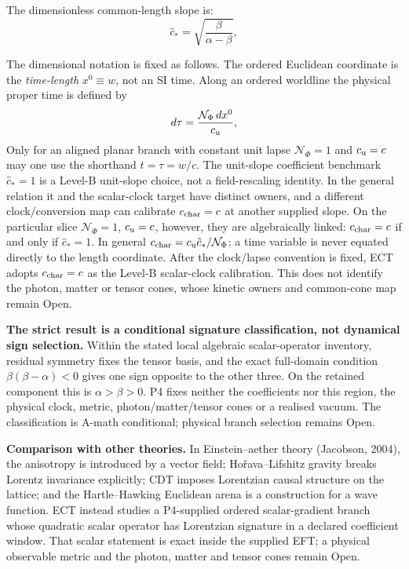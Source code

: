 \documentclass[11pt,a4paper]{article}
\begin{document}
The dimensionless common-length slope is:
\begin{equation}
  \hat c_* = \sqrt{\frac{\beta}{\alpha - \beta}},
  \label{eq:pop_cstar}
\end{equation}

The dimensional notation is fixed as follows.  The ordered Euclidean
coordinate is the \emph{time-length} $x^0\equiv w$, not an SI time.
Along an ordered worldline the physical proper time is defined by
\begin{equation}
  d\tau=\frac{\mathcal N_\Phi\,dx^0}{c_{\rm u}},
  \label{eq:pop_proper_time}
\end{equation}
Only for an aligned planar branch with constant unit lapse
$\mathcal N_\Phi=1$ and $c_{\rm u}=c$ may one use the shorthand
$t=\tau=w/c$.  The unit-slope coefficient benchmark $\hat c_*=1$ is a
Level-B unit-slope choice, not a field-rescaling identity.  In the general
relation it and the scalar-clock target have distinct owners, and a different
clock/conversion map can calibrate $c_{\rm char}=c$ at another supplied slope.
On the particular slice $\mathcal N_\Phi=1$, $c_{\rm u}=c$, however, they are
algebraically linked: $c_{\rm char}=c$ if and only if $\hat c_*=1$.  In general
$c_{\rm char}=c_{\rm u}\hat c_*/\mathcal N_\Phi$; a time variable is never
equated directly to the length coordinate.  After the clock/lapse convention
is fixed, ECT adopts $c_{\rm char}=c$ as the Level-B scalar-clock
calibration.  This does not identify the photon, matter or tensor cones, whose
kinetic owners and common-cone map remain Open.

\textbf{The strict result is a conditional signature classification, not dynamical sign selection.} Within the stated local algebraic scalar-operator inventory, residual symmetry fixes the tensor basis, and the exact full-domain condition $\beta(\beta-\alpha)<0$ gives one sign opposite to the other three.  On the retained component this is $\alpha>\beta>0$. P4 fixes neither the coefficients nor this region, the physical clock, metric, photon/matter/tensor cones or a realised vacuum. The classification is A-math conditional; physical branch selection remains Open.

\textbf{Comparison with other theories.} In Einstein--aether theory (Jacobson, 2004), the anisotropy is introduced by a vector field; Ho\v{r}ava--Lifshitz gravity breaks Lorentz invariance explicitly; CDT imposes Lorentzian causal structure on the lattice; and the Hartle--Hawking Euclidean arena is a construction for a wave function.  ECT instead studies a P4-supplied ordered scalar-gradient branch whose quadratic scalar operator has Lorentzian signature in a declared coefficient window.  That scalar statement is exact inside the supplied EFT; a physical observable metric and the photon, matter and tensor cones remain Open.
\end{document}
